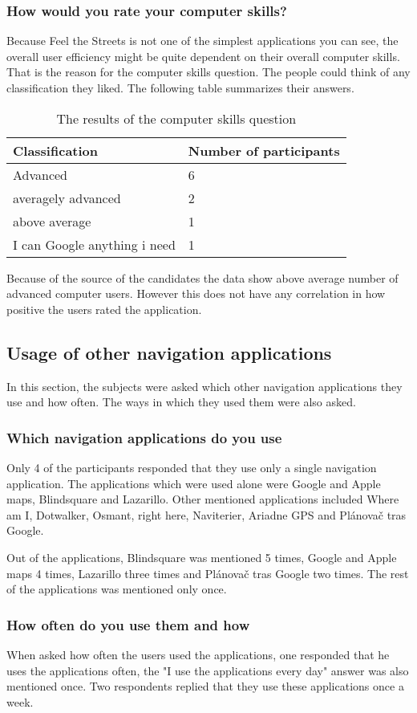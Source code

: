 \documentclass[nolof,digital]{fithesis3}
\begin{document}
\subsubsection{How would you rate your computer skills?}
Because Feel the Streets is not one of the simplest applications you can see, the overall user efficiency might be quite dependent on their overall computer skills. That is the reason for the computer skills question. The people could think of any classification they liked. The following table summarizes their answers.
\begin{table}
\caption{The results of the computer skills question}
\begin{tabularx}{\textwidth}{ |X|X| }
Classification & Number of participants \\
\hline
Advanced & 6 \\
averagely advanced & 2 \\
above average & 1 \\
I can Google anything i need & 1 \\
\end{tabularx}
\end{table}
Because of the source of the candidates the data show above average number of advanced computer users. However this does not have any correlation in how positive the users rated the application.
\subsection{Usage of other navigation applications}
In this section, the subjects were asked which other navigation applications they use and how often. The ways in which they used them were also asked.
\subsubsection{Which navigation applications do you use}
Only 4 of the participants responded that they use only a single navigation application. The applications which were used alone were Google and Apple maps, Blindsquare and Lazarillo. Other mentioned applications included Where am I, Dotwalker, Osmant, right here, Naviterier, Ariadne GPS and Plánovač tras Google.

Out of the applications, Blindsquare was mentioned 5 times, Google and Apple maps 4 times, Lazarillo three times and Plánovač tras Google two times. The rest of the applications was mentioned only once.
\subsubsection{How often do you use them and how}
When asked how often the users used the applications, one responded that he uses the applications often, the "I use the applications every day" answer was also mentioned once. Two respondents replied that they use these applications once a week.
\end{document}
